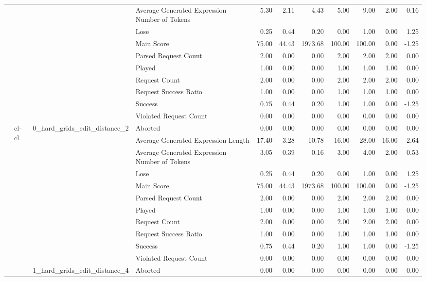 \begin{tabular}{llllrrrrrrr}
 &  &  & Average Generated Expression Number of Tokens & 5.30 & 2.11 & 4.43 & 5.00 & 9.00 & 2.00 & 0.16 \\
 &  &  & Lose & 0.25 & 0.44 & 0.20 & 0.00 & 1.00 & 0.00 & 1.25 \\
 &  &  & Main Score & 75.00 & 44.43 & 1973.68 & 100.00 & 100.00 & 0.00 & -1.25 \\
 &  &  & Parsed Request Count & 2.00 & 0.00 & 0.00 & 2.00 & 2.00 & 2.00 & 0.00 \\
 &  &  & Played & 1.00 & 0.00 & 0.00 & 1.00 & 1.00 & 1.00 & 0.00 \\
 &  &  & Request Count & 2.00 & 0.00 & 0.00 & 2.00 & 2.00 & 2.00 & 0.00 \\
 &  &  & Request Success Ratio & 1.00 & 0.00 & 0.00 & 1.00 & 1.00 & 1.00 & 0.00 \\
 &  &  & Success & 0.75 & 0.44 & 0.20 & 1.00 & 1.00 & 0.00 & -1.25 \\
 &  &  & Violated Request Count & 0.00 & 0.00 & 0.00 & 0.00 & 0.00 & 0.00 & 0.00 \\
\cline{2-11} \cline{3-11}
 & \multirow[t]{22}{*}{cl--cl} & \multirow[t]{11}{*}{0_hard_grids_edit_distance_2} & Aborted & 0.00 & 0.00 & 0.00 & 0.00 & 0.00 & 0.00 & 0.00 \\
 &  &  & Average Generated Expression Length & 17.40 & 3.28 & 10.78 & 16.00 & 28.00 & 16.00 & 2.64 \\
 &  &  & Average Generated Expression Number of Tokens & 3.05 & 0.39 & 0.16 & 3.00 & 4.00 & 2.00 & 0.53 \\
 &  &  & Lose & 0.25 & 0.44 & 0.20 & 0.00 & 1.00 & 0.00 & 1.25 \\
 &  &  & Main Score & 75.00 & 44.43 & 1973.68 & 100.00 & 100.00 & 0.00 & -1.25 \\
 &  &  & Parsed Request Count & 2.00 & 0.00 & 0.00 & 2.00 & 2.00 & 2.00 & 0.00 \\
 &  &  & Played & 1.00 & 0.00 & 0.00 & 1.00 & 1.00 & 1.00 & 0.00 \\
 &  &  & Request Count & 2.00 & 0.00 & 0.00 & 2.00 & 2.00 & 2.00 & 0.00 \\
 &  &  & Request Success Ratio & 1.00 & 0.00 & 0.00 & 1.00 & 1.00 & 1.00 & 0.00 \\
 &  &  & Success & 0.75 & 0.44 & 0.20 & 1.00 & 1.00 & 0.00 & -1.25 \\
 &  &  & Violated Request Count & 0.00 & 0.00 & 0.00 & 0.00 & 0.00 & 0.00 & 0.00 \\
\cline{3-11}
 &  & \multirow[t]{11}{*}{1_hard_grids_edit_distance_4} & Aborted & 0.00 & 0.00 & 0.00 & 0.00 & 0.00 & 0.00 & 0.00 \\

\end{tabular}
